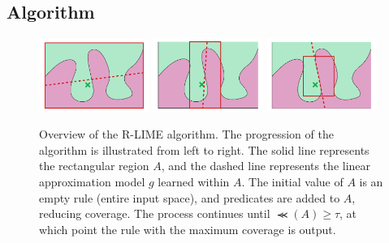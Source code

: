 \documentclass[runningheads]{llncs}
\begin{document}
\subsection{Algorithm}\label{sec:alg}
{%
  \begin{figure}[t]
    \centering
    \includegraphics[width=0.32\textwidth]{rlime1}
    \includegraphics[width=0.32\textwidth]{rlime2}
    \includegraphics[width=0.32\textwidth]{rlime3}
    \caption{%
      Overview of the R-LIME algorithm.
      The progression of the algorithm is illustrated from left to right.
      The solid line represents the rectangular region $A$,
      and the dashed line represents the linear approximation model $g$
      learned within $A$.
      The initial value of $A$ is an empty rule (entire input space),
      and predicates are added to $A$, reducing coverage.
      The process continues until $\Prec(A)\ge\tau$,
      at which point the rule with the maximum coverage is output.
    }
  \end{figure}
  \begin{algorithm}[p]
    
  \end{algorithm}
  \begin{algorithm}[p]
    
  \end{algorithm}
  \def\myidt{\hspace{\algorithmicindent}}
  \begin{algorithm}[p]
    
  \end{algorithm}
  \begin{algorithm}[p]
    
  \end{algorithm}
}
\end{document}

